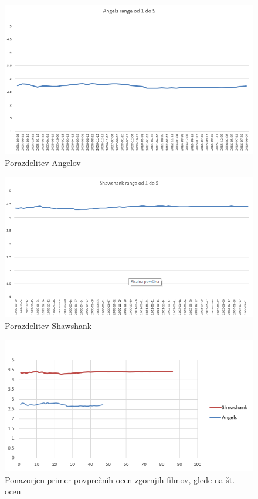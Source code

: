 \documentclass[a4paper,11pt]{article}
\begin{document}
\begin{figure}[htbp]
		\begin{center}
		\includegraphics[scale=0.8]{../slike/agnels_range.png}
		\caption{Porazdelitev Angelov}
		\label{angeli_range}
		\end{center}
\end{figure}


\begin{figure}[htbp]
	\begin{center}
		\includegraphics[scale=0.8]{../slike/shawshank_range.png}
		\caption{Porazdelitev Shawshank}
		\label{shawk_range}
	\end{center}
\end{figure}

\begin{figure}[htbp]
	\begin{center}
		\includegraphics[scale=0.9]{../slike/skupno_ocene.png}
		\caption{Ponazorjen primer povprečnih ocen zgornjih filmov, glede na št. ocen}
		\label{skupno_range}
	\end{center}
\end{figure}
\pagebreak
 
\end{document}

